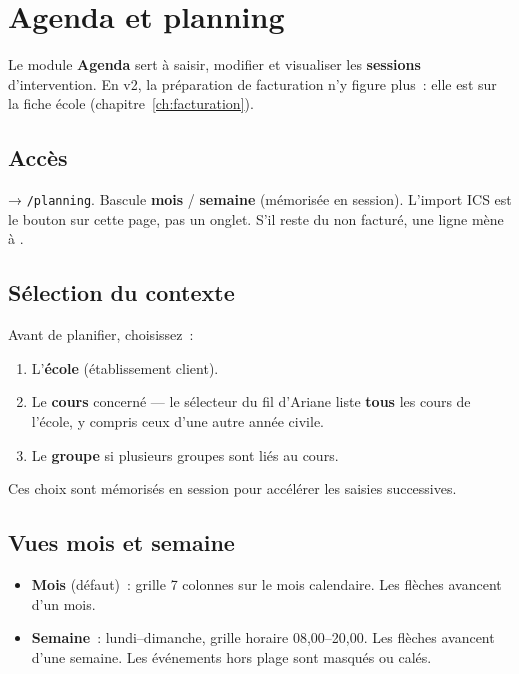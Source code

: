 \chapter{Agenda et planning}
\label{ch:agenda}

Le module \textbf{Agenda} sert à saisir, modifier et visualiser les \textbf{sessions} d'intervention. En v2, la préparation de facturation n'y figure plus~: elle est sur la fiche école (chapitre~\ref{ch:facturation}).

\section{Accès}

 → \texttt{/planning}. Bascule \textbf{mois} / \textbf{semaine} (mémorisée en session). L'import ICS est le bouton  sur cette page, pas un onglet. S'il reste du non facturé, une ligne mène à .


\section{Sélection du contexte}

Avant de planifier, choisissez~:

\begin{enumerate}[label=\textbf{\arabic*.}]
  \item L'\textbf{école} (établissement client).
  \item Le \textbf{cours} concerné — le sélecteur du fil d'Ariane liste \textbf{tous} les cours de l'école, y compris ceux d'une autre année civile.
  \item Le \textbf{groupe} si plusieurs groupes sont liés au cours.
\end{enumerate}

Ces choix sont mémorisés en session pour accélérer les saisies successives.

\section{Vues mois et semaine}

\begin{itemize}[leftmargin=*]
  \item \textbf{Mois} (défaut)~: grille 7 colonnes sur le mois calendaire. Les flèches avancent d'un mois.
  \item \textbf{Semaine}~: lundi--dimanche, grille horaire 08{,}00--20{,}00. Les flèches avancent d'une semaine. Les événements hors plage sont masqués ou calés.
\end{itemize}

